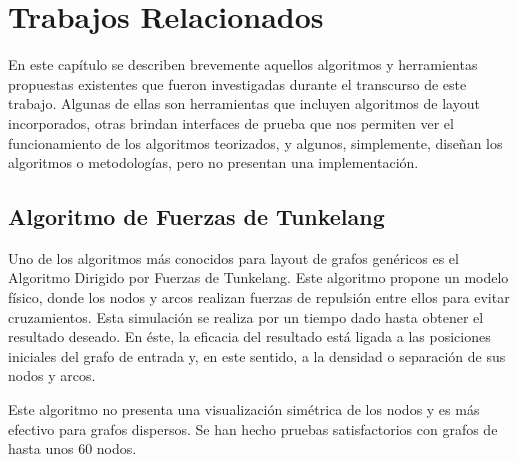 \chapter{Trabajos Relacionados}\label{cap_trabajos_relacionados}
En este capítulo se describen brevemente aquellos algoritmos y herramientas propuestas existentes que fueron investigadas durante el transcurso de este trabajo. Algunas de ellas son herramientas que incluyen algoritmos de layout incorporados, otras brindan interfaces de prueba que nos permiten ver el funcionamiento de los algoritmos teorizados, y algunos, simplemente, diseñan los algoritmos o metodologías, pero no presentan una implementación.



\section{Algoritmo de Fuerzas de Tunkelang}
Uno de los algoritmos más conocidos para layout de grafos genéricos es el Algoritmo Dirigido por Fuerzas de Tunkelang\cite{tunkelang1998jiggle}. Este algoritmo  propone un modelo físico, donde los nodos y arcos realizan fuerzas de repulsión entre ellos para evitar cruzamientos. Esta simulación se realiza por un tiempo dado hasta obtener el resultado deseado. En éste, la eficacia del resultado está ligada a las posiciones iniciales del grafo de entrada y, en este sentido, a la densidad o separación de sus nodos y arcos.

Este algoritmo no presenta una visualización simétrica de los nodos y es más efectivo para grafos dispersos. Se han hecho pruebas satisfactorios con grafos de hasta unos 60 nodos\cite{gibson2013survey}.


